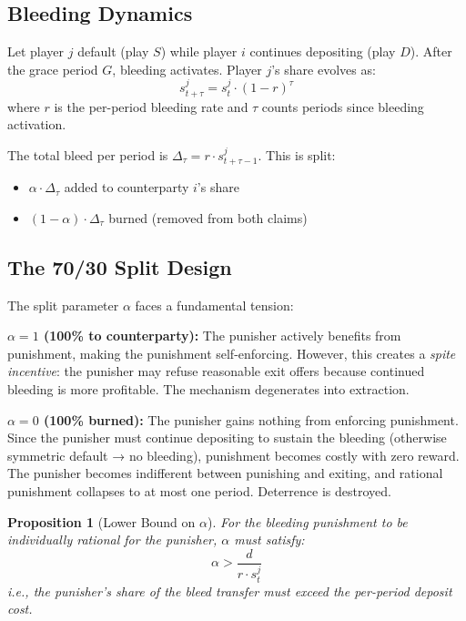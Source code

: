 \documentclass[12pt,a4paper]{article}
\newtheorem{proposition}{Proposition}
\begin{document}
\subsection{Bleeding Dynamics}

Let player $j$ default (play $S$) while player $i$ continues depositing (play $D$). After the grace period $G$, bleeding activates. Player $j$'s share evolves as:
\[
s_{t+\tau}^j = s_t^j \cdot (1 - r)^\tau
\]
where $r$ is the per-period bleeding rate and $\tau$ counts periods since bleeding activation.

The total bleed per period is $\Delta_\tau = r \cdot s_{t+\tau-1}^j$. This is split:
\begin{itemize}
\item $\alpha \cdot \Delta_\tau$ added to counterparty $i$'s share
\item $(1-\alpha) \cdot \Delta_\tau$ burned (removed from both claims)
\end{itemize}

\subsection{The 70/30 Split Design}
\label{sec:bleed-split}

The split parameter $\alpha$ faces a fundamental tension:

\textbf{$\alpha = 1$ (100\% to counterparty):} The punisher actively benefits from punishment, making the punishment self-enforcing. However, this creates a \textit{spite incentive}: the punisher may refuse reasonable exit offers because continued bleeding is more profitable. The mechanism degenerates into extraction.

\textbf{$\alpha = 0$ (100\% burned):} The punisher gains nothing from enforcing punishment. Since the punisher must continue depositing to sustain the bleeding (otherwise symmetric default → no bleeding), punishment becomes costly with zero reward. The punisher becomes indifferent between punishing and exiting, and rational punishment collapses to at most one period. Deterrence is destroyed.

\begin{proposition}[Lower Bound on $\alpha$]
\label{prop:alpha-bound}
For the bleeding punishment to be individually rational for the punisher, $\alpha$ must satisfy:
\[
\alpha > \frac{d}{r \cdot s_t^j}
\]
i.e., the punisher's share of the bleed transfer must exceed the per-period deposit cost.
\end{proposition}
\end{document}
